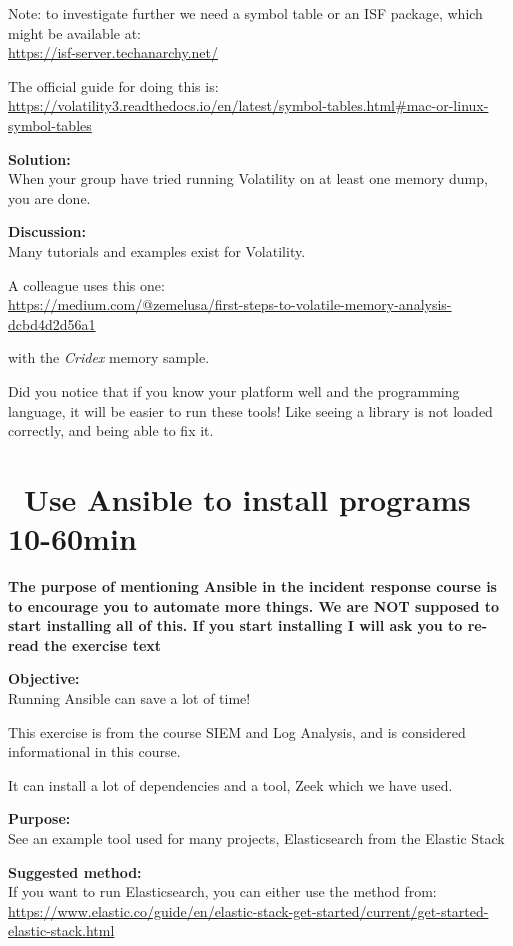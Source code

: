 \documentclass[a4paper,11pt,notitlepage]{report}
\begin{document}
Note: to investigate further we need a symbol table or an ISF package, which might be available at:\\
\url{https://isf-server.techanarchy.net/}

The official guide for doing this is:
\url{https://volatility3.readthedocs.io/en/latest/symbol-tables.html#mac-or-linux-symbol-tables}

{\bf Solution:}\\
When your group have tried running Volatility on at least one memory dump, you are done.

{\bf Discussion:}\\
Many tutorials and examples exist for Volatility.

A colleague uses this one:\\
\url{https://medium.com/@zemelusa/first-steps-to-volatile-memory-analysis-dcbd4d2d56a1}

with the \emph{Cridex} memory sample.

Did you notice that if you know your platform well and the programming language, it will be easier to run these tools! Like seeing a library is not loaded correctly, and being able to fix it.



\chapter{\faInfoCircle\ Use Ansible to install programs 10-60min}
\label{ex:basicansible}


{\bf\LARGE  The purpose of mentioning Ansible in the incident response course is to encourage you to automate more things. We are NOT supposed to start installing all of this. If you start installing I will ask you to re-read the exercise text \smiley}

{\bf Objective:}\\
Running Ansible can save a lot of time!

This exercise is from the course SIEM and Log Analysis, and is considered informational in this course.

It can install a lot of dependencies and a tool, Zeek which we have used.


{\bf Purpose:}\\
See an example tool used for many projects, Elasticsearch from the Elastic Stack

{\bf Suggested method:}\\
If you want to run Elasticsearch, you can either use the method from:\\{\footnotesize
\url{https://www.elastic.co/guide/en/elastic-stack-get-started/current/get-started-elastic-stack.html}}
\end{document}
